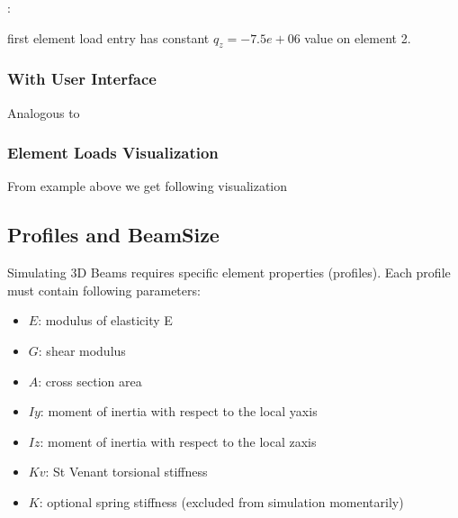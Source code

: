 \documentclass[letterpaper,10pt,english]{sphinxmanual}
\begin{document}
:

\begin{sphinxVerbatim}[commandchars=\\\{\}]
\end{sphinxVerbatim}

first element load entry has constant \(q_z=-7.5e+06\) value on element 2.


\subsubsection{With User Interface}
\label{\detokenize{making_a_model:id18}}
Analogous to {\hyperref[\detokenize{making_a_model:nodes-input}]{}}


\subsubsection{Element Loads Visualization}
\label{\detokenize{making_a_model:element-loads-visualization}}
From example above we get following visualization

\noindent{}


\subsection{Profiles and BeamSize}
\label{\detokenize{making_a_model:profiles-and-beamsize}}
Simulating 3D Beams requires specific element properties (profiles). Each profile must contain following parameters:
\begin{itemize}
\item {} 
\(E\): modulus of elasticity E

\item {} 
\(G\): shear modulus

\item {} 
\(A\): cross section area

\item {} 
\(Iy\): moment of inertia with respect to the local y\sphinxhyphen{}axis

\item {} 
\(Iz\): moment of inertia with respect to the local z\sphinxhyphen{}axis

\item {} 
\(Kv\): St Venant torsional stiffness

\item {} 
\(K\): optional spring stiffness (excluded from simulation momentarily)

\end{itemize}
\end{document}
